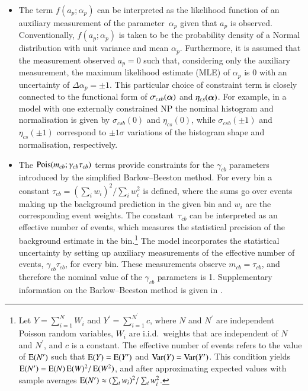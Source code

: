 \begin{itemize}

\item The term $f(a_p; \alpha_p)$ can be interpreted as the likelihood function
  of an auxiliary measurement of the parameter~$\alpha_p$ given that $a_p$ is
  observed. Conventionally, $f(a_p; \alpha_p)$ is taken to be the probability
  density of a Normal distribution with unit variance and mean
  $\alpha_p$. Furthermore, it is assumed that the measurement observed $a_p = 0$
  such that, considering only the auxiliary measurement, the maximum likelihood
  estimate (MLE) of $\alpha_p$ is 0 with an uncertainty of
  $\Delta \alpha_p = \pm 1$. This particular choice of constraint term is
  closely connected to the functional form of $\sigma_{csb}(\bm{\alpha})$ and
  $\eta_{cs}(\bm{\alpha})$. For example, in a model with one externally
  constrained NP the nominal histogram and normalisation is given by
  $\sigma_{csb}(0)$ and $\eta_{cs}(0)$, while $\sigma_{csb}(\pm 1)$ and
  $\eta_{cs}(\pm 1)$ correspond to $\pm 1 \sigma$ variations of the histogram
  shape and normalisation, respectively.


\item The $\operatorname{Pois}(m_{cb}; \gamma_{cb} \tau_{cb})$ terms provide constraints for
  the $\gamma_{cb}$ parameters introduced by the simplified Barlow--Beeston
  method. For every bin a constant
  $ \tau_{cb} = ( \sum_i w_i )^2 / \sum_i w_i^2 $ is defined, where the sums go
  over events making up the background prediction in the given bin and $w_i$ are
  the corresponding event weights. The constant~$\tau_{cb}$ can be interpreted
  as an effective number of events, which measures the statistical precision of
  the background estimate in the bin.\footnote{Let $Y = \sum_{i = 1}^{N} W_i$
    and $Y^\prime = \sum_{i = 1}^{N^\prime} c$, where $N$ and $N^\prime$ are
    independent Poisson random variables, $W_i$ are i.i.d.\ weights that are
    independent of $N$ and $N^\prime$, and $c$ is a constant. The effective
    number of events refers to the value of $\operatorname{E}(N^\prime)$ such that
    $\operatorname{E}(Y) = \operatorname{E}(Y^\prime)$ and $\operatorname{Var}(Y) = \operatorname{Var}(Y^\prime)$. This
    condition yields
    $\operatorname{E}(N^\prime) = \operatorname{E}(N) \operatorname{E}(W)^2 / \operatorname{E}(W^2)$, and after
    approximating expected values with sample averages
    $\operatorname{E}(N^\prime) \approx ( \sum_i w_i )^2 / \sum_i w_i^2$.} The model
  incorporates the statistical uncertainty by setting up auxiliary measurements
  of the effective number of events, $\gamma_{cb}\tau_{cb}$, for every
  bin. These measurements observe $m_{cb} = \tau_{cb}$, and therefore the
  nominal value of the $\gamma_{cb}$ parameters is 1. Supplementary information
  on the Barlow--Beeston method is given in .

\end{itemize}

